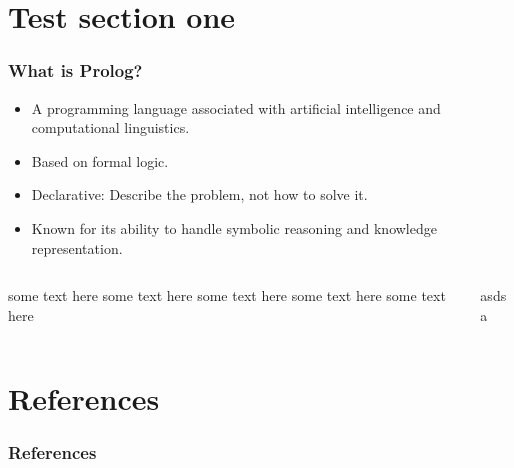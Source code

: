 \documentclass{beamer}
\begin{document}
\section{Test section one}

\begin{frame}
\frametitle{What is Prolog?}
\begin{itemize}
    \item A programming language associated with artificial intelligence and computational linguistics.
    \item Based on formal logic.
    \item Declarative: Describe the problem, not how to solve it.
    \item Known for its ability to handle symbolic reasoning and knowledge representation.
\end{itemize}
\end{frame}


\begin{frame}
\begin{columns}
\begin{column}{0.5\textwidth}
   some text here some text here some text here some text here some text here
\end{column}
\begin{column}{0.5\textwidth}  %
    \begin{center}
       asdsa
     \end{center}
\end{column}
\end{columns}
\end{frame}

\section{References}
 \begin{frame}[allowframebreaks]
         \frametitle{References}
         
         {\tiny }
 \end{frame}
\end{document}
